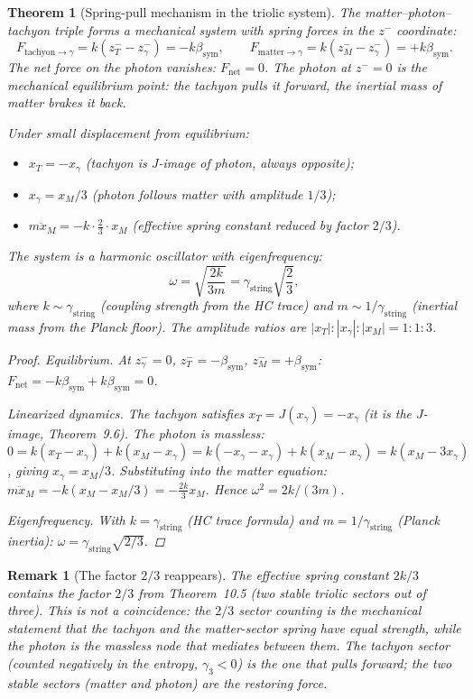 \documentclass[12pt,a4paper]{article}
\newtheorem{theorem}{Theorem}[section]
\newtheorem*{remark}{Remark}
\newcommand{\bsym}{\beta_{\mathrm{sym}}}
\newcommand{\gstring}{\gamma_{\mathrm{string}}}
\newcommand{\zminus}{z^-}
\begin{document}
\begin{theorem}[Spring-pull mechanism in the triolic system]
\label{thm:spring}
The matter--photon--tachyon triple forms a mechanical system with spring
forces in the $\zminus$ coordinate:
\[
  F_{\mathrm{tachyon}\to\gamma} = k(z^-_T-z^-_\gamma) = -k\bsym,
  \qquad
  F_{\mathrm{matter}\to\gamma} = k(z^-_M-z^-_\gamma) = +k\bsym.
\]
The net force on the photon vanishes: $F_{\mathrm{net}}=0$.
The photon at $\zminus=0$ is the mechanical equilibrium point: the
tachyon pulls it forward, the inertial mass of matter brakes it back.

Under small displacement from equilibrium:
\begin{itemize}
  \item $x_T=-x_\gamma$ (tachyon is $J$-image of photon, always opposite);
  \item $x_\gamma=x_M/3$ (photon follows matter with amplitude $1/3$);
  \item $m\ddot x_M=-k\cdot\tfrac{2}{3}\cdot x_M$ (effective spring
        constant reduced by factor $2/3$).
\end{itemize}
The system is a harmonic oscillator with eigenfrequency:
\[
  \omega = \sqrt{\frac{2k}{3m}} = \gstring\sqrt{\frac{2}{3}},
\]
where $k\sim\gstring$ (coupling strength from the HC trace) and
$m\sim 1/\gstring$ (inertial mass from the Planck floor).
The amplitude ratios are $|x_T|:|x_\gamma|:|x_M|=1:1:3$.
\begin{proof}
\emph{Equilibrium.}
At $z^-_\gamma=0$, $z^-_T=-\bsym$, $z^-_M=+\bsym$:
$F_{\mathrm{net}}=-k\bsym+k\bsym=0$.

\emph{Linearized dynamics.}
The tachyon satisfies $x_T=J(x_\gamma)=-x_\gamma$ (it is the $J$-image,
Theorem~9.6).
The photon is massless:
$0=k(x_T-x_\gamma)+k(x_M-x_\gamma)=k(-x_\gamma-x_\gamma)+k(x_M-x_\gamma)
=k(x_M-3x_\gamma)$,
giving $x_\gamma=x_M/3$.
Substituting into the matter equation:
$m\ddot x_M=-k(x_M-x_M/3)=-\tfrac{2k}{3}x_M$.
Hence $\omega^2=2k/(3m)$.

\emph{Eigenfrequency.}
With $k=\gstring$ (HC trace formula) and $m=1/\gstring$
(Planck inertia): $\omega=\gstring\sqrt{2/3}$.
\end{proof}
\end{theorem}

\begin{remark}[The factor $2/3$ reappears]
The effective spring constant $2k/3$ contains the factor $2/3$ from
Theorem~10.5 (two stable triolic sectors out of three).
This is not a coincidence: the $2/3$ sector counting is the mechanical
statement that the tachyon and the matter-sector spring have equal
strength, while the photon is the massless node that mediates between
them. The tachyon sector (counted negatively in the entropy,
$\gamma_3<0$) is the one that pulls forward; the two stable sectors
(matter and photon) are the restoring force.
\end{remark}
\end{document}
